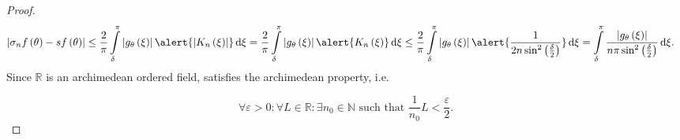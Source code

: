 \begin{frame}[allowframebreaks]
\begin{proof}
		\begin{align*}
			\left|
			\sigma_{n}f\left(\theta\right)-
			sf\left(\theta\right)
			\right| & \leq
			\frac{2}{\pi}
			\int\limits_{\delta}^{\pi}
			\left|
			g_{\theta}\left(\xi\right)
			\right|
			\alert{
				\left|
				K_{n}\left(\xi\right)
				\right|
			}
			\dl\xi=
			\frac{2}{\pi}
			\int\limits_{\delta}^{\pi}
			\left|
			g_{\theta}\left(\xi\right)
			\right|
			\alert{K_{n}\left(\xi\right)}
			\dl\xi
			\leq
			\frac{2}{\pi}
			\int\limits_{\delta}^{\pi}
			\left|
			g_{\theta}\left(\xi\right)
			\right|
			\alert{
				\frac{1}{
					2n\sin^{2}\left(\frac{\delta}{2}\right)
				}
			}
			\dl\xi
			=
			\int\limits_{\delta}^{\pi}
			\frac{
				\left|
				g_{\theta}\left(\xi\right)
				\right|
			}{
				n\pi\sin^{2}\left(\frac{\delta}{2}\right)
			}
			\dl\xi.
		\end{align*}
		Since $\mathds{R}$ is an \alert{archimedean} ordered field,
		satisfies the \alert{archimedean property}, i.e.

		\begin{equation*}
			\forall\varepsilon>0:
			\forall L\in\mathds{R}:
			\exists n_{0}\in\mathds{N}
			\text{ such that }
			\frac{1}{n_{0}}L<
			\frac{\varepsilon}{2}.
		\end{equation*}
	\end{proof}
\end{frame}

